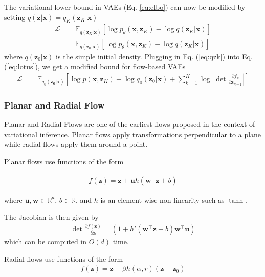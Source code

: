 \documentclass[runningheads]{llncs}
\begin{document}
The variational lower bound in VAEs (Eq. \ref{eq:elbo}) can now be modified by setting $q(\mathbf{z}|\mathbf{x}) = q_K(\mathbf{z}_K|\mathbf{x})$
\begin{align}
\mathcal{L} &= \mathbb{E}_{q(\mathbf{z}_K|\mathbf{x})}\left[\log p_\theta(\mathbf{x}, \mathbf{z}_K) - \log q(\mathbf{z}_K|\mathbf{x})\right]\\
&= \mathbb{E}_{q(\mathbf{z}_0|\mathbf{x})}\left[\log p_\theta(\mathbf{x}, \mathbf{z}_K) - \log q(\mathbf{z}_K|\mathbf{x})\right]\label{eq:lotus}
\end{align}
where $q(\mathbf{z}_0|\mathbf{x})$ is the simple initial density. Plugging in Eq. (\ref{eq:qzk}) into Eq. (\ref{eq:lotus}), we get a modified bound for flow-based VAEs
\begin{align}
\mathcal{L} &= \mathbb{E}_{q_0(\mathbf{z_0}|\mathbf{x})}\left[\log p(\mathbf{x},\mathbf{z}_K) - \log q_0(\mathbf{z}_0|\mathbf{x}) + \sum_{k=1}^K\log\left|\det \frac{\partial f_k}{\partial \mathbf{z}_{k-1}}\right| \right]
\end{align}
\subsubsection{Planar and Radial Flow} 
Planar and Radial Flows \cite{rezende2015variational} are one of the earliest flows proposed in the context of variational inference. Planar flows apply transformations perpendicular to a plane while radial flows apply them around a point. 

Planar flows use functions of the form

\begin{align}
f(\mathbf{z}) = \mathbf{z} + \mathbf{u}h(\mathbf{w}^\top\mathbf{z} + b)
\label{eq:planarfn}
\end{align}

where $\mathbf{u},\mathbf{w}\in \mathbb{R}^d$, $b \in \mathbb{R}$, and $h$ is an element-wise non-linearity such as $\tanh$.

The Jacobian is then given by
\begin{align}
\det\frac{\partial f(\mathbf{z})}{\partial \mathbf{z}} =(1 + h'(\mathbf{w}^\top\mathbf{z} + b)\mathbf{w}^\top\mathbf{u})
\end{align}
which can be computed in $O(d)$ time.

Radial flows use functions of the form
\begin{align}
f(\mathbf{z}) = \mathbf{z} + \beta h(\alpha,r)(\mathbf{z}-\mathbf{z}_0)
\label{eq:radialfn}
\end{align}
\end{document}
